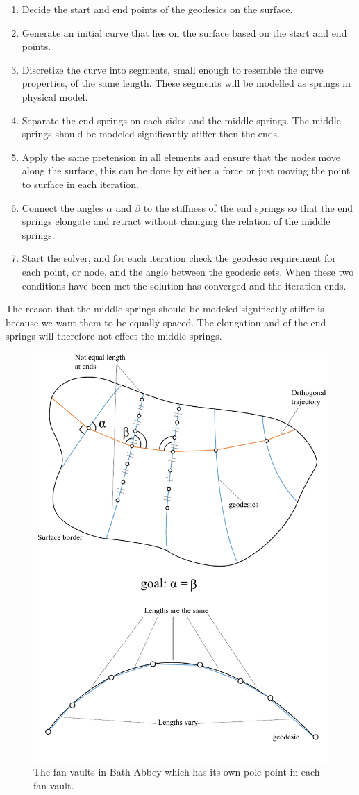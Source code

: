 \begin{enumerate}
\item Decide the start and end points of the geodesics on the surface.
\item Generate an initial curve that lies on the surface based on the start and end points.
\item Discretize  the curve into segments, small enough to resemble the curve properties, of the same length. These segments will be modelled as springs in physical model. 
\item Separate the end springs on each sides and the middle springs. The middle springs should be modeled significantly stiffer then the ends.
\item Apply the same pretension in all elements and ensure that the nodes move along the surface, this can be done by either a force or just moving the point to surface in each iteration. 
\item Connect the angles $\alpha$ and $\beta$ to the stiffness of the end springs so that the end springs elongate and retract without changing the relation of the middle springs. 
\item Start the solver, and for each iteration check the geodesic requirement for each point, or node, and the angle between the geodesic sets. When these two conditions have been met the solution has converged and the iteration ends.
\end{enumerate}

The reason that the middle springs should be modeled significatly stiffer is because we want them to be equally spaced. The elongation and of the end springs will therefore not effect the middle springs.


 
\begin{figure}[H]
\centering
\includegraphics[width=0.9\linewidth ]{figure/Method/GeodesicCoord.pdf}
\caption{The fan vaults in Bath Abbey which has its own pole point in each fan vault.}
\end{figure}

